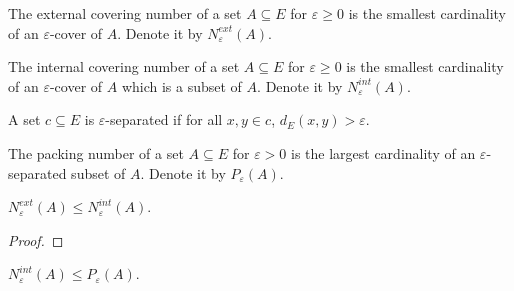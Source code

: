 \begin{definition}\label{def:externalCoveringNumber}
  \leanok
  The external covering number of a set $A \subseteq E$ for $\varepsilon \ge 0$ is the smallest cardinality of an $\varepsilon$-cover of $A$.
  Denote it by $N^{ext}_\varepsilon(A)$.
\end{definition}


\begin{definition}\label{def:internalCoveringNumber}
  \leanok
  The internal covering number of a set $A \subseteq E$ for $\varepsilon \ge 0$ is the smallest cardinality of an $\varepsilon$-cover of $A$ which is a subset of $A$.
  Denote it by $N^{int}_\varepsilon(A)$.
\end{definition}


\begin{definition}\label{def:IsSeparated}
  \mathlibok
A set $c \subseteq E$ is $\varepsilon$-separated if for all $x, y \in c$, $d_E(x, y) > \varepsilon$.
\end{definition}


\begin{definition}\label{def:packingNumber}
  \leanok
The packing number of a set $A \subseteq E$ for $\varepsilon > 0$ is the largest cardinality of an $\varepsilon$-separated subset of $A$.
Denote it by $P_\varepsilon(A)$.
\end{definition}


\begin{lemma}\label{lem:externalCoveringNumber_le_internalCoveringNumber}
  \leanok
$N^{ext}_\varepsilon(A) \le N^{int}_\varepsilon(A)$.
\end{lemma}

\begin{proof}\leanok

\end{proof}


\begin{lemma}\label{lem:internalCoveringNumber_le_packingNumber}
  \leanok
$N^{int}_\varepsilon(A) \le P_\varepsilon(A)$.
\end{lemma}

